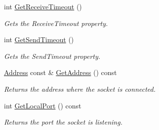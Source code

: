 \begin{DoxyCompactItemize}
int \hyperlink{class_common_1_1_socket_base_af78c9fc6d72218fcff3dd9debe710120}{Get\-Receive\-Timeout} ()
\begin{DoxyCompactList}\small\item\em Gets the Receive\-Timeout property. \end{DoxyCompactList}\item 
int \hyperlink{class_common_1_1_socket_base_ab6506aebdbc5a128a79f6c562ebadcb7}{Get\-Send\-Timeout} ()
\begin{DoxyCompactList}\small\item\em Gets the Send\-Timeout property. \end{DoxyCompactList}\item 
\hypertarget{class_common_1_1_socket_base_a99f8ec3cd9d625a9e1fc25f8bdb35514}{\hyperlink{class_common_1_1_address}{Address} const \& \hyperlink{class_common_1_1_socket_base_a99f8ec3cd9d625a9e1fc25f8bdb35514}{Get\-Address} () const }\label{class_common_1_1_socket_base_a99f8ec3cd9d625a9e1fc25f8bdb35514}

\begin{DoxyCompactList}\small\item\em Returns the address where the socket is connected. \end{DoxyCompactList}\item 
\hypertarget{class_common_1_1_socket_base_acaa47e72141198c31f0a00d138d3b5dd}{int \hyperlink{class_common_1_1_socket_base_acaa47e72141198c31f0a00d138d3b5dd}{Get\-Local\-Port} () const }\label{class_common_1_1_socket_base_acaa47e72141198c31f0a00d138d3b5dd}

\begin{DoxyCompactList}\small\item\em Returns the port the socket is listening. \end{DoxyCompactList}\end{DoxyCompactItemize}

